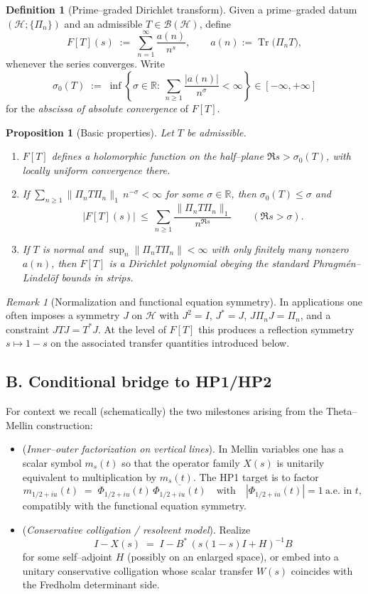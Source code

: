 \documentclass[11pt]{article}
\numberwithin{equation}{section}
\newtheorem{proposition}[theorem]{Proposition}
\theoremstyle{definition}
\newtheorem{definition}[theorem]{Definition}
\theoremstyle{remark}
\newtheorem{remark}[theorem]{Remark}
\newcommand{\Tr}{\operatorname{Tr}}
\newcommand{\1}{\mathbbm{1}}
\begin{document}
\begin{definition}[Prime–graded Dirichlet transform]
Given a prime–graded datum $(\mathcal H;\{\Pi_n\})$ and an admissible $T\in\mathcal B(\mathcal H)$, define
\[
F[T](s)\;:=\;\sum_{n=1}^{\infty}\frac{a(n)}{n^{s}},\qquad 
a(n):=\Tr\bigl(\Pi_n T\bigr),
\]
whenever the series converges. Write
\[
\sigma_0(T)\;:=\;\inf\left\{\sigma\in\mathbb R:\ \sum_{n\ge1}\frac{|a(n)|}{n^\sigma}<\infty\right\}\in[-\infty,+\infty]
\]
for the \emph{abscissa of absolute convergence} of $F[T]$.
\end{definition}

\begin{proposition}[Basic properties]
Let $T$ be admissible.
\begin{enumerate}
\item $F[T]$ defines a holomorphic function on the half–plane $\Re s>\sigma_0(T)$, with locally uniform convergence there.
\item If $\sum_{n\ge1}\|\Pi_n T\Pi_n\|_1\,n^{-\sigma}<\infty$ for some $\sigma\in\mathbb R$, then $\sigma_0(T)\le\sigma$ and
\[
|F[T](s)|\ \le\ \sum_{n\ge1}\frac{\|\Pi_n T\Pi_n\|_1}{n^{\Re s}}\qquad(\Re s>\sigma).
\]
\item If $T$ is normal and $\sup_{n}\|\Pi_n T\Pi_n\|<\infty$ with only finitely many nonzero $a(n)$, then $F[T]$ is a Dirichlet polynomial obeying the standard Phragmén–Lindelöf bounds in strips.
\end{enumerate}
\end{proposition}

\begin{remark}[Normalization and functional equation symmetry]
In applications one often imposes a symmetry $J$ on $\mathcal H$ with $J^2=I$, $J^*=J$, $J\Pi_nJ=\Pi_n$, and a constraint $JTJ=T^*J$. At the level of $F[T]$ this produces a reflection symmetry $s\mapsto 1-s$ on the associated transfer quantities introduced below.
\end{remark}

\subsection*{B. Conditional bridge to HP1/HP2}

For context we recall (schematically) the two milestones arising from the Theta–Mellin construction:
\begin{itemize}
\item[\textbf{HP1}] (\emph{Inner–outer factorization on vertical lines}). In Mellin variables one has a scalar symbol $m_s(t)$ so that the operator family $X(s)$ is unitarily equivalent to multiplication by $m_s(t)$. The HP1 target is to factor
\[
m_{1/2+iu}(t)\;=\;\Phi_{1/2+iu}(t)\,\overline{\Phi_{1/2+iu}(t)}\quad\text{with}\quad |\Phi_{1/2+iu}(t)|=1\ \text{a.e.\ in $t$},
\]
compatibly with the functional equation symmetry.
\item[\textbf{HP2}] (\emph{Conservative colligation / resolvent model}). Realize
\[
I-X(s)\;=\;I-B^*\,(s(1-s)I+H)^{-1}B
\]
for some self–adjoint $H$ (possibly on an enlarged space), or embed into a unitary conservative colligation whose scalar transfer $W(s)$ coincides with the Fredholm determinant side.
\end{itemize}
\end{document}
